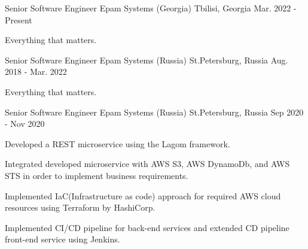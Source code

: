 

\begin{cventries}

  \cventry
    {Senior Software Engineer} %
    {Epam Systems (Georgia)} %
    {Tbilisi, Georgia} %
    {Mar. 2022 - Present} %
    {
      \begin{cvitems} %
        \item {Everything that matters.}
      \end{cvitems}
    }

\cventry
{Senior Software Engineer} %
{Epam Systems (Russia)} %
{St.Petersburg, Russia} %
{Aug. 2018 - Mar. 2022} %
{
  \begin{cvitems} %
    \item {Everything that matters.}
  \end{cvitems}
}

\cventry
{Senior Software Engineer} %
{Epam Systems (Russia)} %
{St.Petersburg, Russia} %
{Sep 2020 - Nov 2020 } %
{
  \begin{cvitems} %
    \item {Developed a REST microservice using the Lagom framework.}
    \item {Integrated developed microservice with AWS S3, AWS DynamoDb, and AWS STS in order to implement business requirements.}
    \item {Implemented IaC(Infrastructure as code) approach for required AWS cloud resources using Terraform by HashiCorp.}
    \item {Implemented CI/CD pipeline for back-end services and extended CD pipeline front-end service using Jenkins.}
  \end{cvitems}
}


\end{cventries}
